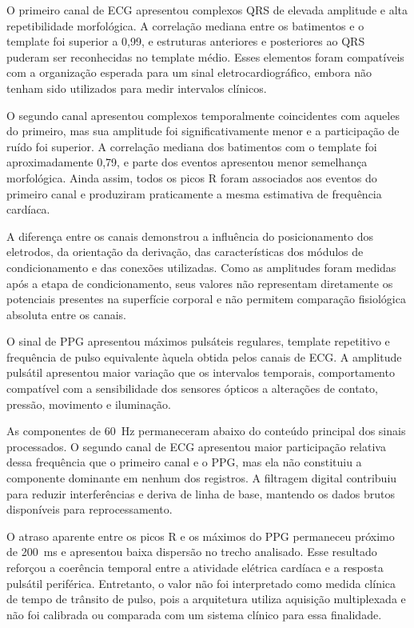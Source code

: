 \documentclass[a4paper,12pt]{fcte}
\begin{document}
O primeiro canal de ECG apresentou complexos QRS de elevada amplitude e alta repetibilidade morfológica. A correlação mediana entre os batimentos e o template foi superior a 0,99, e estruturas anteriores e posteriores ao QRS puderam ser reconhecidas no template médio. Esses elementos foram compatíveis com a organização esperada para um sinal eletrocardiográfico, embora não tenham sido utilizados para medir intervalos clínicos.

O segundo canal apresentou complexos temporalmente coincidentes com aqueles do primeiro, mas sua amplitude foi significativamente menor e a participação de ruído foi superior. A correlação mediana dos batimentos com o template foi aproximadamente 0,79, e parte dos eventos apresentou menor semelhança morfológica. Ainda assim, todos os picos R foram associados aos eventos do primeiro canal e produziram praticamente a mesma estimativa de frequência cardíaca.

A diferença entre os canais demonstrou a influência do posicionamento dos eletrodos, da orientação da derivação, das características dos módulos de condicionamento e das conexões utilizadas. Como as amplitudes foram medidas após a etapa de condicionamento, seus valores não representam diretamente os potenciais presentes na superfície corporal e não permitem comparação fisiológica absoluta entre os canais.

O sinal de PPG apresentou máximos pulsáteis regulares, template repetitivo e frequência de pulso equivalente àquela obtida pelos canais de ECG. A amplitude pulsátil apresentou maior variação que os intervalos temporais, comportamento compatível com a sensibilidade dos sensores ópticos a alterações de contato, pressão, movimento e iluminação.

As componentes de 60~Hz permaneceram abaixo do conteúdo principal dos sinais processados. O segundo canal de ECG apresentou maior participação relativa dessa frequência que o primeiro canal e o PPG, mas ela não constituiu a componente dominante em nenhum dos registros. A filtragem digital contribuiu para reduzir interferências e deriva de linha de base, mantendo os dados brutos disponíveis para reprocessamento.

O atraso aparente entre os picos R e os máximos do PPG permaneceu próximo de 200~ms e apresentou baixa dispersão no trecho analisado. Esse resultado reforçou a coerência temporal entre a atividade elétrica cardíaca e a resposta pulsátil periférica. Entretanto, o valor não foi interpretado como medida clínica de tempo de trânsito de pulso, pois a arquitetura utiliza aquisição multiplexada e não foi calibrada ou comparada com um sistema clínico para essa finalidade.
\end{document}
